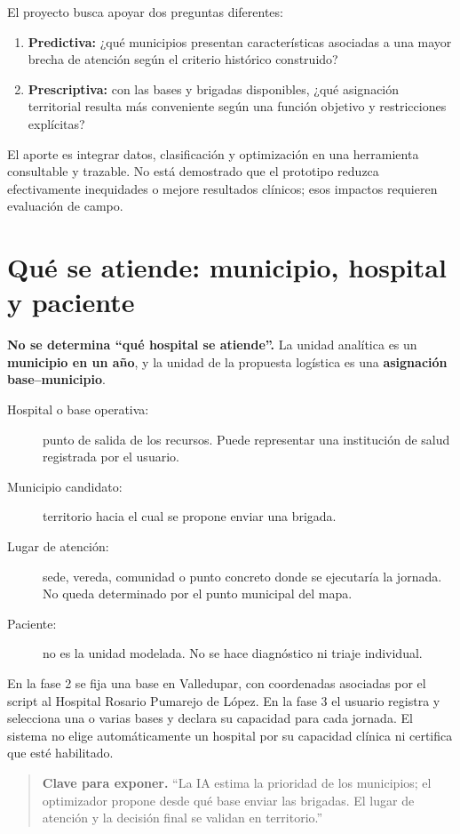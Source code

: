 \documentclass[11pt,a4paper]{report}
\newcommand{\nota}[1]{\begin{quote}\color{verde}\textbf{Clave para exponer.} #1\end{quote}}
\begin{document}
El proyecto busca apoyar dos preguntas diferentes:
\begin{enumerate}
\item \textbf{Predictiva:} ¿qué municipios presentan características asociadas a una mayor brecha de atención según el criterio histórico construido?
\item \textbf{Prescriptiva:} con las bases y brigadas disponibles, ¿qué asignación territorial resulta más conveniente según una función objetivo y restricciones explícitas?
\end{enumerate}
El aporte es integrar datos, clasificación y optimización en una herramienta consultable y trazable. No está demostrado que el prototipo reduzca efectivamente inequidades o mejore resultados clínicos; esos impactos requieren evaluación de campo.

\section{Qué se atiende: municipio, hospital y paciente}
\textbf{No se determina ``qué hospital se atiende''.} La unidad analítica es un \textbf{municipio en un año}, y la unidad de la propuesta logística es una \textbf{asignación base--municipio}.
\begin{description}
\item[Hospital o base operativa:] punto de salida de los recursos. Puede representar una institución de salud registrada por el usuario.
\item[Municipio candidato:] territorio hacia el cual se propone enviar una brigada.
\item[Lugar de atención:] sede, vereda, comunidad o punto concreto donde se ejecutaría la jornada. No queda determinado por el punto municipal del mapa.
\item[Paciente:] no es la unidad modelada. No se hace diagnóstico ni triaje individual.
\end{description}
En la fase 2 se fija una base en Valledupar, con coordenadas asociadas por el script al Hospital Rosario Pumarejo de López. En la fase 3 el usuario registra y selecciona una o varias bases y declara su capacidad para cada jornada. El sistema no elige automáticamente un hospital por su capacidad clínica ni certifica que esté habilitado.

\nota{``La IA estima la prioridad de los municipios; el optimizador propone desde qué base enviar las brigadas. El lugar de atención y la decisión final se validan en territorio.''}
\end{document}

